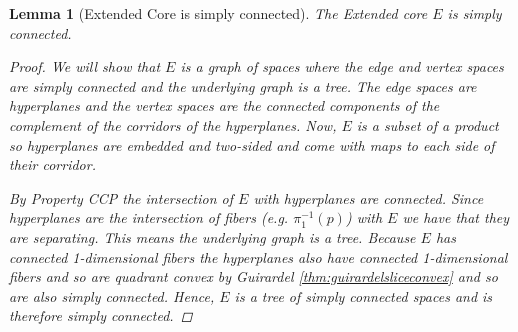 \documentclass[12pt,parskip=full]{report}
\theoremstyle{plain}
\newtheorem{lem}[thm]{Lemma}
\theoremstyle{definition}
\begin{document}
\begin{lem}
    [Extended Core is simply connected]
    \label{lem:coresc} 
    The Extended core $E$ is simply connected.
    
    \begin{proof}
    
        
    
        We will show that $E$ is a graph of spaces where the edge and vertex spaces are simply connected and the underlying graph is a tree. The edge spaces are hyperplanes and the vertex spaces are the connected components of the complement of the corridors of the hyperplanes. Now, $E$ is a subset of a product so hyperplanes are embedded and two-sided and come with maps to each side of their corridor. 
        
        By Property CCP the intersection of $E$ with hyperplanes are connected. Since hyperplanes are the intersection of fibers (e.g. $\pi_1^{-1}(p)$) with $E$ we have that they are separating. This means the underlying graph is a tree. Because $E$ has connected 1-dimensional fibers the hyperplanes also have connected 1-dimensional fibers and so are quadrant convex by Guirardel \ref{thm:guirardelsliceconvex} and so are also simply connected. Hence, $E$ is a tree of simply connected spaces and is therefore simply connected.
        
        



        

\end{proof}
\end{lem}
\end{document}
